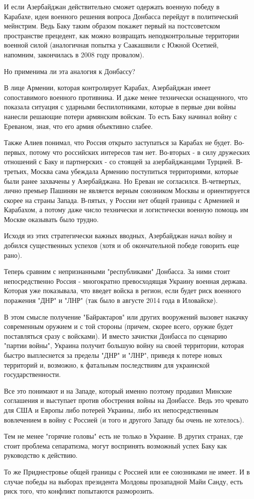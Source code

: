 И если Азербайджан действительно сможет одержать военную победу в Карабахе,
идеи военного решения вопроса Донбасса перейдут в политический мейнстрим. Ведь
Баку таким образом покажет первый на постсоветском пространстве прецедент, как
можно возвращать неподконтрольные территории военной силой (аналогичная попытка
у Саакашвили с Южной Осетией, напомним, закончилась в 2008 году провалом). 

Но применима ли эта аналогия к Донбассу?

В лице Армении, которая контролирует Карабах, Азербайджан имеет сопоставимого
военного противника. И даже менее технически оснащенного, что показала ситуация
с ударными беспилотниками, которые в первые дни войны нанесли решающие потери
армянским войскам. То есть Баку начинал войну с Ереваном, зная, что его армия
объективно слабее. 

Также Алиев понимал, что Россия открыто заступаться за Карабах не будет.
Во-первых, потому что российских интересов там нет. Во-вторых - в силу
дружеских отношений с Баку и партнерских - со стоящей за азербайджанцами
Турцией. В-третьих, Москва сама убеждала Армению поступиться территориями,
которые были ранее захвачены у Азербайджана. Но Ереван не согласился.
В-четвертых, лично премьер Пашинян не является верным союзником Москвы и
ориентируется скорее на страны Запада. В-пятых, у России нет общей границы с
Арменией и Карабахом, а потому даже число технически и логистически военную
помощь им Москве оказывать было трудно.

Исходя из этих стратегически важных вводных, Азербайджан начал войну и добился
существенных успехов (хотя и об окончательной победе говорить еще рано). 

Теперь сравним с непризнанными "республиками" Донбасса. За ними стоит
непосредственно Россия - многократно превосходящая Украину военная держава.
Которая уже показывала, что введет войска в регион, если будет риск военного
поражения "ДНР" и "ЛНР" (так было в августе 2014 года в Иловайске). 

В этом смысле получение "Байрактаров" или других вооружений вызовет накачку
современным оружием и с той стороны (причем, скорее всего, оружие будет
поставляться сразу с войсками). И вместо зачистки Донбасса по сценарию "партии
войны", Украина получит большую войну на своей территории, которая быстро
выплеснется за пределы "ДНР" и "ЛНР", приведя к потере новых территорий и,
возможно, к фатальным последствиям для украинской государственности. 

Все это понимают и на Западе, который именно поэтому продавил Минские
соглашения и выступает против обострения войны на Донбассе. Ведь это чревато
для США и Европы либо потерей Украины, либо их непосредственным вовлечением в
войну с Россией (и того и другого Западу бы очень не хотелось). 

Тем не менее "горячие головы" есть не только в Украине. В других странах, где
стоит проблема сепаратизма, могут воспринять возможный успех Баку как
руководство к действию.

То же Приднестровье общей границы с Россией или ее союзниками не имеет. И в
случае победы на выборах президента Молдовы прозападной Майи Санду, есть риск
того, что конфликт попытаются разморозить. 
